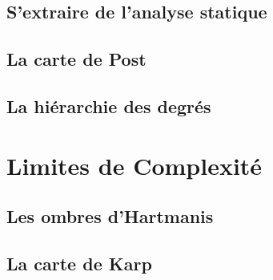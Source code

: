\documentclass[9pt, handout]{beamer}
\begin{document}
\subsection{S'extraire de l'analyse statique}










 
\subsection{La carte de Post}






 
\subsection{La hiérarchie des degrés}




 
\section{Limites de Complexité}
 
\subsection{Les ombres d'Hartmanis}
 








 
\subsection{La carte de Karp}







 
\end{document}
